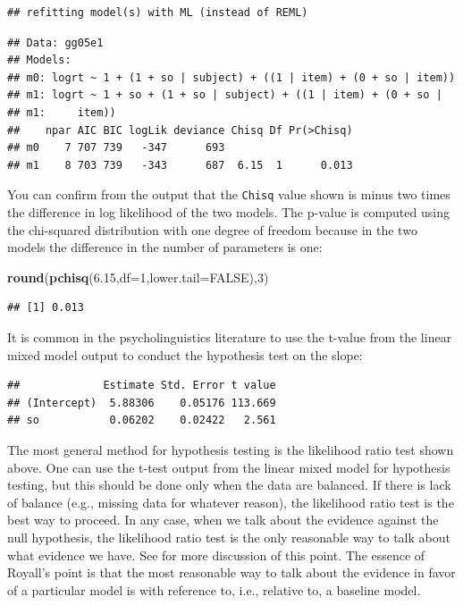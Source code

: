 \documentclass[12pt,]{krantz}
\newenvironment{Shaded}{\begin{snugshade}}{\end{snugshade}}
\newcommand{\DataTypeTok}[1]{\textcolor[rgb]{0.13,0.29,0.53}{#1}}
\newcommand{\DecValTok}[1]{\textcolor[rgb]{0.00,0.00,0.81}{#1}}
\newcommand{\FloatTok}[1]{\textcolor[rgb]{0.00,0.00,0.81}{#1}}
\newcommand{\KeywordTok}[1]{\textcolor[rgb]{0.13,0.29,0.53}{\textbf{#1}}}
\newcommand{\NormalTok}[1]{#1}
\newcommand{\OperatorTok}[1]{\textcolor[rgb]{0.81,0.36,0.00}{\textbf{#1}}}
\newcommand{\OtherTok}[1]{\textcolor[rgb]{0.56,0.35,0.01}{#1}}
\begin{document}
\begin{verbatim}
## refitting model(s) with ML (instead of REML)
\end{verbatim}

\begin{verbatim}
## Data: gg05e1
## Models:
## m0: logrt ~ 1 + (1 + so | subject) + ((1 | item) + (0 + so | item))
## m1: logrt ~ 1 + so + (1 + so | subject) + ((1 | item) + (0 + so | 
## m1:     item))
##    npar AIC BIC logLik deviance Chisq Df Pr(>Chisq)
## m0    7 707 739   -347      693                    
## m1    8 703 739   -343      687  6.15  1      0.013
\end{verbatim}

You can confirm from the output that the \texttt{Chisq} value shown is minus two times the difference in log likelihood of the two models. The p-value is computed using the chi-squared distribution with one degree of freedom because in the two models the difference in the number of parameters is one:

\begin{Shaded}
\begin{Highlighting}[]
\KeywordTok{round}\NormalTok{(}\KeywordTok{pchisq}\NormalTok{(}\FloatTok{6.15}\NormalTok{,}\DataTypeTok{df=}\DecValTok{1}\NormalTok{,}\DataTypeTok{lower.tail=}\OtherTok{FALSE}\NormalTok{),}\DecValTok{3}\NormalTok{)}
\end{Highlighting}
\end{Shaded}

\begin{verbatim}
## [1] 0.013
\end{verbatim}

It is common in the psycholinguistics literature to use the t-value from the linear mixed model output to conduct the hypothesis test on the slope:

\begin{Shaded}
\end{Shaded}

\begin{verbatim}
##             Estimate Std. Error t value
## (Intercept)  5.88306    0.05176 113.669
## so           0.06202    0.02422   2.561
\end{verbatim}

The most general method for hypothesis testing is the likelihood ratio test shown above. One can use the t-test output from the linear mixed model for hypothesis testing, but this should be done only when the data are balanced. If there is lack of balance (e.g., missing data for whatever reason), the likelihood ratio test is the best way to proceed. In any case, when we talk about the evidence against the null hypothesis, the likelihood ratio test is the only reasonable way to talk about what evidence we have. See \citet{Royall} for more discussion of this point. The essence of Royall's point is that the most reasonable way to talk about the evidence in favor of a particular model is with reference to, i.e., relative to, a baseline model.
\end{document}
